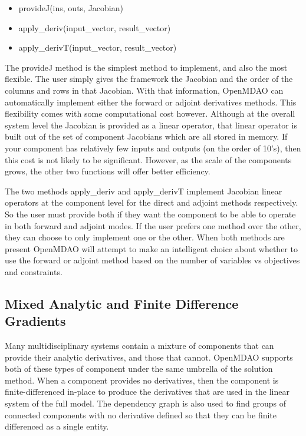 \documentclass[]{aiaa-tc} %
\begin{document}
    \begin{itemize}
        \item provideJ(ins, outs, Jacobian)
        \item apply\_deriv(input\_vector, result\_vector)
        \item apply\_derivT(input\_vector, result\_vector)
    \end{itemize}
    
    The provideJ method is the simplest method to implement, and also the most flexible. The user simply gives the framework the 
    Jacobian and the order of the columns and rows in that Jacobian. With that information, OpenMDAO can automatically 
    implement either the forward or adjoint derivatives methods. This flexibility comes with some computational cost however. 
    Although at the overall system level the Jacobian is provided as a linear operator, that linear operator is built out 
    of the set of component Jacobians which are all stored in memory. If your component has relatively few inputs and outputs 
    (on the order of 10's), then this cost is not likely to be significant. However, as the scale of the components grows, 
    the other two functions will offer better efficiency. 

    The two methods apply\_deriv and apply\_derivT implement Jacobian linear operators at 
    the component level for the direct and adjoint methods respectively. So the user must provide both if they 
    want the component to be able to operate in both forward and adjoint modes. If the user prefers one method over 
    the other, they can choose to only implement one or the other. When both methods are present OpenMDAO will 
    attempt to make an intelligent choice about whether to use the forward or adjoint method based on the number 
    of variables vs objectives and constraints. 
    
    \subsection{Mixed Analytic and Finite Difference Gradients}
    
    Many multidisciplinary systems contain a mixture of components that can provide their analytic derivatives, and
    those that cannot. OpenMDAO supports both of these types of component under the same umbrella of the
    solution method. When a component provides no derivatives, then the component is finite-differenced in-place to
    produce the derivatives that are used in the linear system of the full model. The dependency graph is also used
    to find groups of connected components with no derivative defined so that they can be finite differenced as a single entity. 
    
\end{document}
